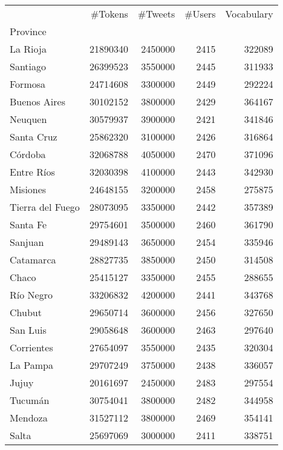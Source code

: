 \begin{tabular}{lrrrr}
\toprule
{} &   \#Tokens &  \#Tweets &  \#Users &  Vocabulary \\
Province         &           &          &         &             \\
\midrule
La Rioja         &  21890340 &  2450000 &    2415 &      322089 \\
Santiago         &  26399523 &  3550000 &    2445 &      311933 \\
Formosa          &  24714608 &  3300000 &    2449 &      292224 \\
Buenos Aires     &  30102152 &  3800000 &    2429 &      364167 \\
Neuquen          &  30579937 &  3900000 &    2421 &      341846 \\
Santa Cruz       &  25862320 &  3100000 &    2426 &      316864 \\
Córdoba          &  32068788 &  4050000 &    2470 &      371096 \\
Entre Ríos       &  32030398 &  4100000 &    2443 &      342930 \\
Misiones         &  24648155 &  3200000 &    2458 &      275875 \\
Tierra del Fuego &  28073095 &  3350000 &    2442 &      357389 \\
Santa Fe         &  29754601 &  3500000 &    2460 &      361790 \\
Sanjuan          &  29489143 &  3650000 &    2454 &      335946 \\
Catamarca        &  28827735 &  3850000 &    2450 &      314508 \\
Chaco            &  25415127 &  3350000 &    2455 &      288655 \\
Río Negro        &  33206832 &  4200000 &    2441 &      343768 \\
Chubut           &  29650714 &  3600000 &    2456 &      327650 \\
San Luis         &  29058648 &  3600000 &    2463 &      297640 \\
Corrientes       &  27654097 &  3550000 &    2435 &      320304 \\
La Pampa         &  29707249 &  3750000 &    2438 &      336057 \\
Jujuy            &  20161697 &  2450000 &    2483 &      297554 \\
Tucumán          &  30754041 &  3800000 &    2482 &      344958 \\
Mendoza          &  31527112 &  3800000 &    2469 &      354141 \\
Salta            &  25697069 &  3000000 &    2411 &      338751 \\
\bottomrule
\end{tabular}
